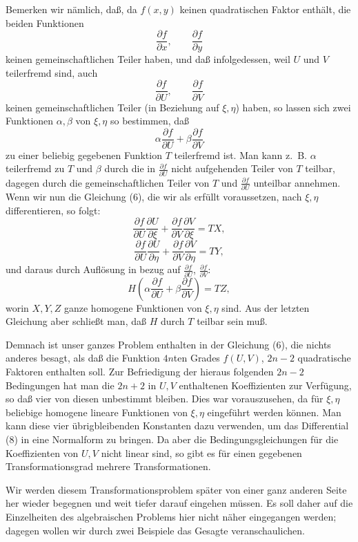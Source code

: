 \documentclass[11pt]{article}
\begin{document}
Bemerken wir nämlich, daß, da $f(x,y)$ keinen quadratischen Faktor enthält, die beiden Funktionen
\[
\frac{\partial f}{\partial x},\qquad \frac{\partial f}{\partial y}
\]
keinen gemeinschaftlichen Teiler haben, und daß infolgedessen, weil $U$ und $V$ teilerfremd sind, auch
\[
\frac{\partial f}{\partial U},\qquad \frac{\partial f}{\partial V}
\]
keinen gemeinschaftlichen Teiler (in Beziehung auf $\xi,\eta$) haben, so lassen sich zwei Funktionen $\alpha,\beta$ von $\xi,\eta$ so bestimmen, daß
\[
\alpha\frac{\partial f}{\partial U}+\beta\frac{\partial f}{\partial V}
\]
zu einer beliebig gegebenen Funktion $T$ teilerfremd ist. Man kann z.~B. $\alpha$ teilerfremd zu $T$ und $\beta$ durch die in $\frac{\partial f}{\partial U}$ nicht aufgehenden Teiler von $T$ teilbar, dagegen durch die gemeinschaftlichen Teiler von $T$ und $\frac{\partial f}{\partial U}$ unteilbar annehmen. Wenn wir nun die Gleichung (6), die wir als erfüllt voraussetzen, nach $\xi,\eta$ differentieren, so folgt:
\[
\frac{\partial f}{\partial U}\frac{\partial U}{\partial\xi}
+\frac{\partial f}{\partial V}\frac{\partial V}{\partial\xi}=TX,
\]
\[
\frac{\partial f}{\partial U}\frac{\partial U}{\partial\eta}
+\frac{\partial f}{\partial V}\frac{\partial V}{\partial\eta}=TY,
\]
und daraus durch Auflösung in bezug auf $\frac{\partial f}{\partial U}$, $\frac{\partial f}{\partial V}$:
\[
H\left(\alpha\frac{\partial f}{\partial U}+\beta\frac{\partial f}{\partial V}\right)=TZ,
\]
worin $X,Y,Z$ ganze homogene Funktionen von $\xi,\eta$ sind. Aus der letzten Gleichung aber schließt man, daß $H$ durch $T$ teilbar sein muß.

Demnach ist unser ganzes Problem enthalten in der Gleichung (6), die nichts anderes besagt, als daß die Funktion $4n$ten Grades $f(U,V)$, $2n-2$ quadratische Faktoren enthalten soll. Zur Befriedigung der hieraus folgenden $2n-2$ Bedingungen hat man die $2n+2$ in $U,V$ enthaltenen Koeffizienten zur Verfügung, so daß vier von diesen unbestimmt bleiben. Dies war vorauszusehen, da für $\xi,\eta$ beliebige homogene lineare Funktionen von $\xi,\eta$ eingeführt werden können. Man kann diese vier übrigbleibenden Konstanten dazu verwenden, um das Differential (8) in eine Normalform zu bringen. Da aber die Bedingungsgleichungen für die Koeffizienten von $U,V$ nicht linear sind, so gibt es für einen gegebenen Transformationsgrad mehrere Transformationen.

Wir werden diesem Transformationsproblem später von einer ganz anderen Seite her wieder begegnen und weit tiefer darauf eingehen müssen. Es soll daher auf die Einzelheiten des algebraischen Problems hier nicht näher eingegangen werden; dagegen wollen wir durch zwei Beispiele das Gesagte veranschaulichen.
\end{document}
